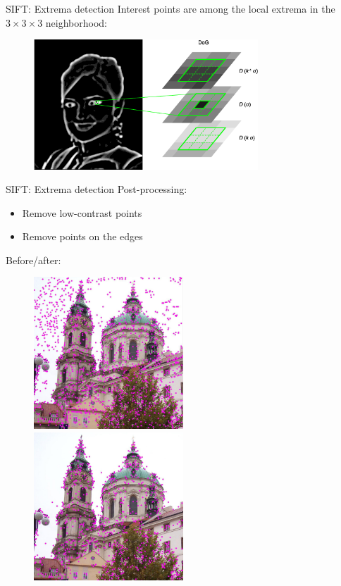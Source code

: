 \documentclass{beamer}
\newcommand{\1}[1]{\mathbbm{1}\left[#1\right]}
\begin{document}
\begin{frame}{SIFT: Extrema detection}
Interest points are among the local extrema in the $3\times3\times3$ neighborhood:
\begin{figure}
\centering
\includegraphics[width=0.75\textwidth]{images/sift_extrema.png}
\end{figure}
\end{frame}

\begin{frame}{SIFT: Extrema detection}
Post-processing:
\begin{itemize}
	\item Remove low-contrast points
	\item Remove points on the edges
\end{itemize}
\pause
\vfill
Before/after:
\begin{figure}
\centering
\includegraphics[width=0.5\textwidth]{images/sift_all_points.png}~
\includegraphics[width=0.5\textwidth]{images/sift_interest_points.png}
\end{figure}
\end{frame}
\end{document}
